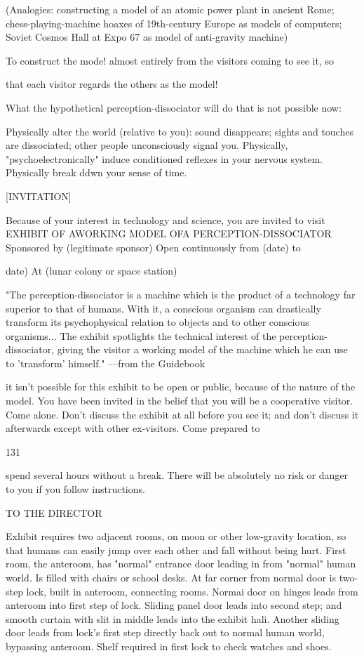 \documentclass[10pt,twoside]{memoir}
\begin{document}
\begin{enumerate}
{\begin{enumerate}
\begin{sysrules}
\begin{sysrules}
\begin{sysrules}
\begin{sysrules}
{\begin{enumerate}
{{{(Analogies: constructing a model of an atomic power plant in ancient 
Rome; chess-playing-machine hoaxes of 19th-century Europe as 
models of computers; Soviet Cosmos Hall at Expo 67 as model 
of anti-gravity machine) 

To construct the mode! almost entirely from the visitors coming to see it, so 

that each visitor regards the others as the model! 


What the hypothetical perception-dissociator will do that is not 
possible now: 


Physically alter the world (relative to you): sound disappears; sights and 
touches are dissociated; other people unconsciously signal you. 
Physically, "psychoelectronically" induce conditioned reflexes in your 
nervous system. Physically break ddwn your sense of time. 


[INVITATION] 


Because of your interest in technology and science, you are invited to visit 
EXHIBIT OF AWORKING MODEL OFA 
PERCEPTION-DISSOCIATOR 
Sponsored by (legitimate sponsor) Open continuously from (date) 
to {date) At (lunar colony or space station) 

"The perception-dissociator is a machine which is the product of a 
technology far superior to that of humans. With it, a conscious organism can 
drastically transform its psychophysical relation to objects and to other 
conscious organisms... The exhibit spotlights the technical interest of the 
perception-dissociator, giving the visitor a working model of the machine 
which he can use to 'transform' himself." —from the Guidebook 


it isn't possible for this exhibit to be open or public, because of the nature of 
the model. You have been invited in the belief that you will be a cooperative 
visitor. Come alone. Don't discuss the exhibit at all before you see it; and 
don't discuss it afterwards except with other ex-visitors. Come prepared to 


131 


spend several hours without a break. There will be absolutely no risk or 
danger to you if you follow instructions. 


TO THE DIRECTOR 


Exhibit requires two adjacent rooms, on moon or other low-gravity 
location, so that humans can easily jump over each other and fall without 
being hurt. First room, the anteroom, has "normal" entrance door leading in 
from "normal" human world. Is filled with chairs or school desks. At far 
corner from normal door is two-step lock, built in anteroom, connecting 
rooms. Normai door on hinges leads from anteroom into first step of lock. 
Sliding panel door leads into second step; and smooth curtain with slit in 
middle leads into the exhibit hali. Another sliding door leads from lock's 
first step directly back out to normal human world, bypassing anteroom. 
Shelf required in first lock to check watches and shoes. 

}}}}
\end{enumerate}}
\end{sysrules}
\end{sysrules}
\end{sysrules}
\end{sysrules}
\end{enumerate}}
\end{enumerate}
\end{document}
